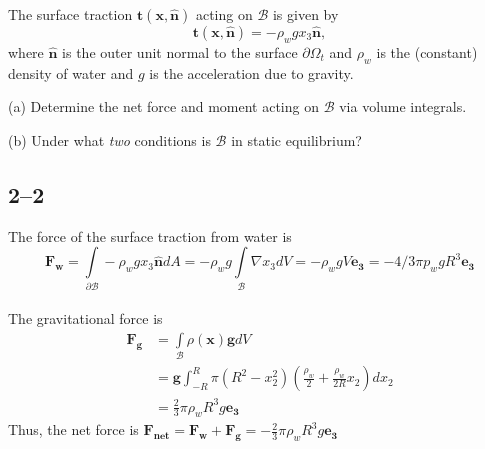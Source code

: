\vspace{-1em}
The surface traction $\bm{t}(\bm{x},\hat{\bm{n}})$ acting on $\mathcal{B}$ is given by 
\begin{equation*}
\bm{t}(\bm{x},\hat{\bm{n}}) = -\rho_w g x_3 \hat{\bm{n}},
\end{equation*}
where $\hat{\bm{n}}$ is the outer unit normal to the surface $\partial \Omega_t$ and $\rho_w$ is the (constant) density of water and $g$ is the acceleration due to gravity. 

\medskip
(a) Determine the net force and moment acting on $\mathcal{B}$ via volume integrals.

\medskip
(b) Under what \textit{two} conditions is $\mathcal{B}$ in static equilibrium?

\subsection*{2--2}
The force of the surface traction from water is
\begin{equation*}
    \bm{F_w} = \int\limits_{\partial \mathcal{B}} -\rho_w g x_3 \hat{\bm{n}}dA =-\rho_w g \int \limits_\mathcal{B}\nabla{x_3}dV =-\rho_w g V\bm{e_3} = -4/3\pi p_wgR^3 \bm{e_3}
\end{equation*} \\
The gravitational force is
\begin{align*}
    \bm{F_g}& = \int \limits_{\mathcal{B}}\rho(\bm{x})\bm{g}dV \\
    &=\bm{g} 
    \int^{R}_{-R}\pi (R^2-x^2_2)(\frac{\rho_w}2 +\frac{\rho_w}{2R} x_2)dx_2  \\
    &= \frac23 \pi \rho_w R^3g \bm{e_3}
\end{align*}
Thus, the net force is $\bm{F_{net}} = \bm{F_w} +\bm{F_g} = -\frac23 \pi \rho_w R^3g \bm{e_3}$ \\

